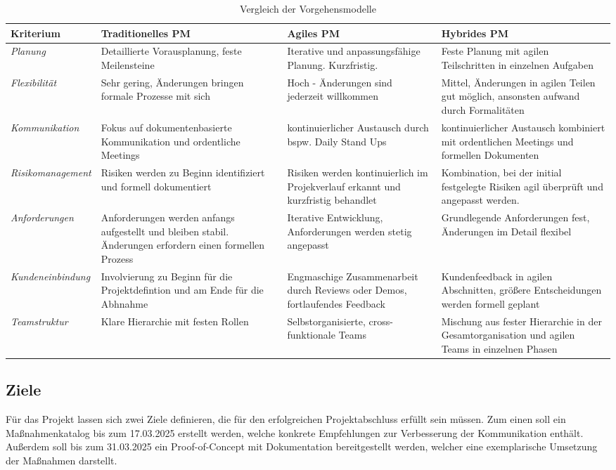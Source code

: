 \documentclass[ThesisDJ.tex]{subfiles}
\begin{document}
  \begin{table}
    \begin{tabular}{|p{4cm}|p{4cm}|p{4cm}|p{4cm}|}
      \hline 
      Kriterium & Traditionelles PM & Agiles PM & Hybrides PM \\
      \hline
      \emph{Planung} & Detaillierte Vorausplanung, feste Meilensteine & Iterative und anpassungsfähige Planung. Kurzfristig. & Feste Planung mit agilen Teilschritten in einzelnen Aufgaben\\
      \hline
      \emph{Flexibilität} & Sehr gering, Änderungen bringen formale Prozesse mit sich & Hoch - Änderungen sind jederzeit willkommen & Mittel, Änderungen in agilen Teilen gut möglich, ansonsten aufwand durch Formalitäten \\
      \hline
      \emph{Kommunikation} & Fokus auf dokumentenbasierte Kommunikation und ordentliche Meetings & kontinuierlicher Austausch durch bspw. Daily Stand Ups & kontinuierlicher Austausch kombiniert mit ordentlichen Meetings und formellen Dokumenten \\
      \hline
      \emph{Risikomanagement} & Risiken werden zu Beginn identifiziert und formell dokumentiert & Risiken werden kontinuierlich im Projekverlauf erkannt und kurzfristig behandlet & Kombination, bei der initial festgelegte Risiken agil überprüft und angepasst werden. \\
      \hline
      \emph{Anforderungen} & Anforderungen werden anfangs aufgestellt und bleiben stabil. Änderungen erfordern einen formellen Prozess & Iterative Entwicklung, Anforderungen werden stetig angepasst & Grundlegende Anforderungen fest, Änderungen im Detail flexibel \\
      \hline
      \emph{Kundeneinbindung} & Involvierung zu Beginn für die Projektdefintion und am Ende für die Abhnahme & Engmaschige Zusammenarbeit durch Reviews oder Demos, fortlaufendes Feedback & Kundenfeedback in agilen Abschnitten, größere Entscheidungen werden formell geplant \\ 
      \hline
      \emph{Teamstruktur} & Klare Hierarchie mit festen Rollen & Selbstorganisierte, cross-funktionale Teams & Mischung aus fester Hierarchie in der Gesamtorganisation und agilen Teams in einzelnen Phasen \\
      \hline
    \end{tabular}
    \caption{Vergleich der Vorgehensmodelle}
    \label{tab:methods}
  \end{table}
	
	\subsection{Ziele}
  Für das Projekt lassen sich zwei Ziele definieren, die für den erfolgreichen Projektabschluss erfüllt sein müssen.
  Zum einen soll ein Maßnahmenkatalog bis zum 17.03.2025 erstellt werden, welche konkrete Empfehlungen zur Verbesserung der Kommunikation
  enthält. Außerdem soll bis zum 31.03.2025 ein Proof-of-Concept mit Dokumentation bereitgestellt werden, welcher eine exemplarische Umsetzung
  der Maßnahmen darstellt. 
\end{document}
